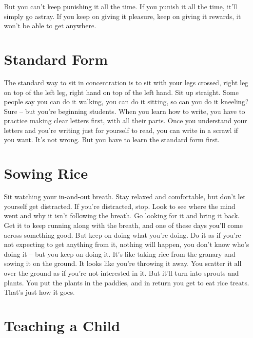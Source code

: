But you can't keep punishing it all the time. If you punish it all the time, it'll simply go astray. If you keep on giving it pleasure, keep on giving it rewards, it won't be able to get anywhere.

\clearpage

\section{Standard Form}

The standard way to sit in concentration is to sit with your legs crossed, right leg on top of the left leg, right hand on top of the left hand. Sit up straight. Some people say you can do it walking, you can do it sitting, so can you do it kneeling? Sure -- but you're beginning students. When you learn how to write, you have to practice making clear letters first, with all their parts. Once you understand your letters and you're writing just for yourself to read, you can write in a scrawl if you want. It's not wrong. But you have to learn the standard form first.

\vspace*{-\baselineskip}
\section{Sowing Rice}

\enlargethispage{2\baselineskip}
Sit watching your in-and-out breath. Stay relaxed and comfortable, but don't let yourself get distracted. If you're distracted, stop. Look to see where the mind went and why it isn't following the breath. Go looking for it and bring it back. Get it to keep running along with the breath, and one of these days you'll come across something good. But keep on doing what you're doing. Do it as if you're not expecting to get anything from it, nothing will happen, you don't know who's doing it -- but you keep on doing it. It's like taking rice from the granary and sowing it on the ground. It looks like you're throwing it away. You scatter it all over the ground as if you're not interested in it. But it'll turn into sprouts and plants. You put the plants in the paddies, and in return you get to eat rice treats. That's just how it goes.

\clearpage

\section{Teaching a Child}

